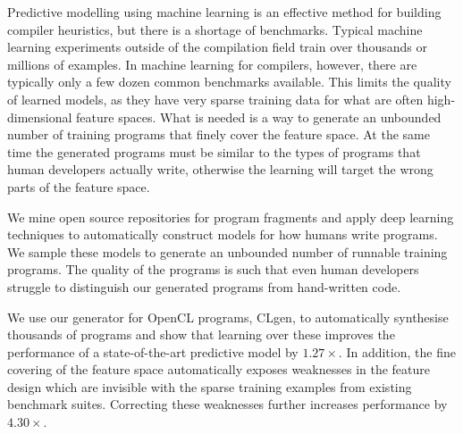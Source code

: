 Predictive modelling using machine learning is an effective method for building compiler heuristics, but there is a shortage of benchmarks. Typical machine learning experiments outside of the compilation field train over thousands or millions of examples. In machine learning for compilers, however, there are typically only a few dozen common benchmarks available. This limits the quality of learned models, as they have very sparse training data for what are often high-dimensional feature spaces. What is needed is a way to generate an unbounded number of training programs that finely cover the feature space. At the same time the generated programs must be similar to the types of programs that human developers actually write, otherwise the learning will  target the wrong parts of the feature space. 

We mine open source repositories for program fragments and apply deep learning techniques to automatically construct models for how humans write programs. We sample these models to generate an unbounded number of runnable training programs. The quality of the programs is such that even human developers struggle to distinguish our generated programs from hand-written code.

We use our generator for OpenCL programs, CLgen, to automatically synthesise thousands of programs and show that learning over these improves the performance of a state-of-the-art predictive model by $1.27\times$. In addition, the fine covering of the feature space automatically exposes weaknesses in the feature design which are invisible with the sparse training examples from existing benchmark suites. Correcting these weaknesses further increases performance by $4.30\times$.
